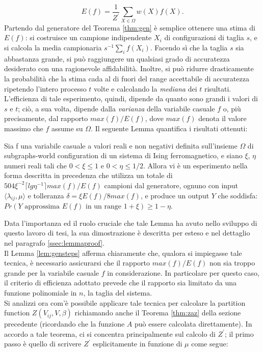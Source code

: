 \begin{equation}
	E(f) = \frac{1}{Z^{\prime}}\sum_{X\in\Omega}{w(X)f(X)}.
	\label{e_f}
\end{equation}
Partendo dal generatore del Teorema \ref{thm:gen} è semplice ottenere una stima di $E(f)$: si costruisce un campione indipendente ${X_i}$ di configurazioni di taglia $s$, e si calcola la media campionaria $s^{-1}\sum_i{f(X_i)}$. Facendo sì che la taglia $s$ sia abbastanza grande, si può raggiungere un qualsiasi grado di accuratezza desiderato con una ragionevole affidabilità. Inoltre, si può ridurre drasticamente la probabilità che la stima cada al di fuori del range accettabile di accuratezza ripetendo l'intero processo $t$ volte e calcolando la \textit{mediana} dei $t$ risultati. L'efficienza di tale esperimento, quindi, dipende da quanto sono grandi i valori di $s$ e $t$; ciò, a sua volta, dipende dalla \textit{varianza} della variabile casuale $f$ o, più precisamente, dal rapporto $max(f)/E(f)$, dove $max(f)$ denota il valore massimo che $f$ assume su $\Omega$.
Il seguente Lemma quantifica i risultati ottenuti:
\begin{lem}
	Sia f una variabile casuale a valori reali e non negativi definita sull'insieme $\Omega$ di subgraphs-world configuration di un sistema di Ising ferromagnetico, e siano $\xi$, $\eta$ numeri reali tali che $0 < \xi \leq 1$ e $0 < \eta \leq 1/2$. Allora vi è un esperimento nella forma descritta in precedenza che utilizza un totale di $504\xi^{-2}\lceil lg\eta^{-1} \rceil max(f)/E(f)$ campioni dal generatore, ognuno con input $\langle\lambda_{ij}, \mu \rangle$ e tolleranza $\delta = \xi E(f)/8max(f)$, e produce un output $Y$ che soddisfa: $Pr(Y \text{ approssima } E(f) \text{ in un range } 1+\xi) \geq 1 - \eta$.
	\label{lem:gensteps}
\end{lem}
Data l'importanza ed il ruolo cruciale che tale Lemma ha avuto nello sviluppo di questo lavoro di tesi, la sua dimostrazione è descritta per esteso e nel dettaglio nel paragrafo \ref{ssec:lemmaproof}.\\
Il Lemma \ref{lem:gensteps} afferma chiaramente che, qualora si impiegasse tale tecnica, è necessario assicurarsi che il rapporto $max(f)/E(f)$ non sia troppo grande per la variabile casuale $f$ in considerazione. In particolare per questo caso, il criterio di efficienza adottato prevede che il rapporto sia limitato da una funzione polinomiale in $n$, la taglia del sistema.\\
Si analizzi ora com'è possibile applicare tale tecnica per calcolare la partition function $Z(V_{ij}, V, \beta)$ richiamando anche il Teorema \ref{thm:zaz} della sezione precedente (ricordando che la funzione $A$ può essere calcolata direttamente). In accordo a tale teorema, ci si concentra principalmente sul calcolo di $Z^{\prime}$; il primo passo è quello di scrivere $Z^{\prime}$ esplicitamente in funzione di $\mu$ come segue:
